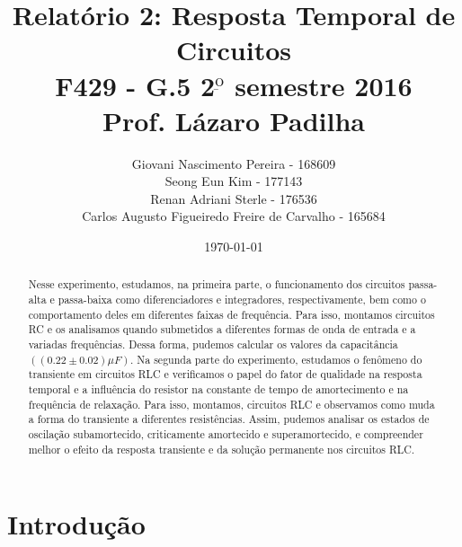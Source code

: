 \documentclass[11pt,a4paper]{article}
\begin{document}
\title{Relatório 2: Resposta Temporal de Circuitos \\
\small{F429 - G.5  2$^{ \underbar{\text{o}} }$ semestre 2016 \\
Prof. Lázaro Padilha }}
\author{Giovani Nascimento Pereira - 168609 \\
Seong Eun Kim - 177143\\
Renan Adriani Sterle - 176536\\
Carlos Augusto Figueiredo Freire de Carvalho - 165684}

\date{\today}

\maketitle
\begin{abstract}
    Nesse experimento, estudamos, na primeira parte, o funcionamento dos circuitos passa-alta e passa-baixa como diferenciadores e integradores, respectivamente, bem como o comportamento deles em diferentes faixas de frequência. Para isso, montamos circuitos RC e os analisamos quando submetidos a diferentes formas de onda de entrada e a variadas frequências. Dessa forma, pudemos calcular os valores da capacitância $((0.22 \pm 0.02) \mu F)$. Na segunda parte do experimento, estudamos o fenômeno do transiente em circuitos RLC e verificamos o papel do fator de qualidade na resposta temporal e a influência do resistor na constante de tempo de amortecimento e na frequência de relaxação. Para isso, montamos, circuitos RLC e observamos como muda a forma do transiente a diferentes resistências. Assim, pudemos analisar os estados de oscilação subamortecido, criticamente amortecido e superamortecido, e compreender melhor o efeito da resposta transiente e da solução permanente nos circuitos RLC.
\end{abstract}

\newpage %
\tableofcontents %

\newpage
\section{Introdução}
    
\end{document}
